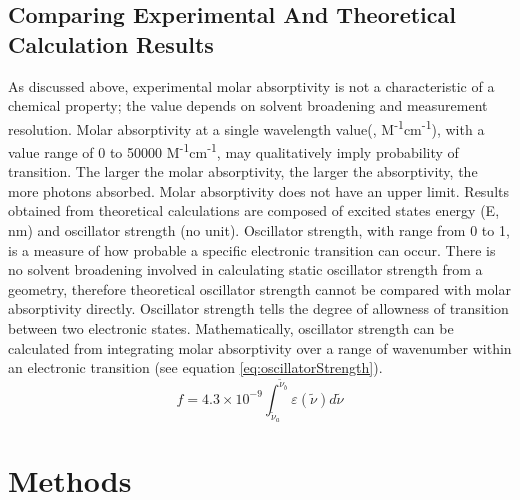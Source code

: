 \documentclass[
journal=jpcbfk, %
manuscript=article]{achemso}
\begin{document}
	\subsection{Comparing Experimental And Theoretical Calculation Results}
	As discussed above, experimental molar absorptivity is not a characteristic of a chemical property; the value depends on solvent broadening and measurement resolution. Molar absorptivity at a single wavelength value(\textepsilon, M\textsuperscript{-1}cm\textsuperscript{-1}), with a value range of 0 to 50000 M\textsuperscript{-1}cm\textsuperscript{-1}, may qualitatively imply probability of transition. The larger the molar absorptivity, the larger the absorptivity, the more photons absorbed. Molar absorptivity does not have an upper limit. Results obtained from theoretical calculations are composed of excited states energy (E, nm) and oscillator strength (no unit).\cite{Hilborn1982} Oscillator strength, with range from 0 to 1, is a measure of how probable a specific electronic transition can occur. There is no solvent broadening involved in calculating static oscillator strength from a geometry, therefore theoretical oscillator strength cannot be compared with molar absorptivity directly.  Oscillator strength tells the degree of allowness of transition between two electronic states. Mathematically, oscillator strength can be calculated from integrating molar absorptivity over a range of wavenumber within an electronic transition (see equation \ref{eq:oscillatorStrength}).\cite{Klan2009}
	\begin{equation}
	\label{eq:oscillatorStrength}
	f = 4.3\times 10^{-9}\int_{\widetilde{\nu}_{a}}^{\widetilde{\nu}_{b}}\varepsilon(\widetilde{\nu}) d\widetilde{\nu}
	\end{equation}	
	
	\clearpage
	
	\section{Methods}
\end{document}
